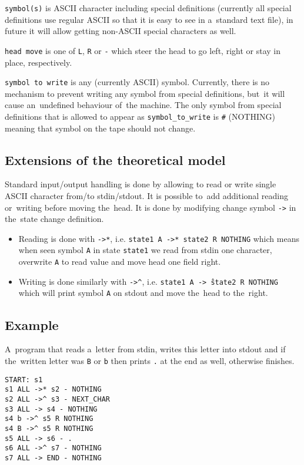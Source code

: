 \documentclass[english,shortabstract,mgr]{iithesis}
\begin{document}
\texttt{symbol(s)} is ASCII character including special definitions (currently
all special definitions use regular ASCII so that it is easy to see
in a~standard text file), in future it will allow getting non-ASCII special
characters as well.

\texttt{head move} is one of \texttt{L}, \texttt{R} or \texttt{-} which
steer the head to go left, right or stay in place, respectively.

\texttt{symbol to write} is any (currently ASCII) symbol. Currently, there
is no mechanism to prevent writing any symbol from special definitions,
but~it will cause an~undefined behaviour of~the machine. The only symbol
from special definitions that is allowed to appear as \texttt{symbol\_to\_write}
is \texttt{\#} (NOTHING) meaning that symbol on the tape should not change.

\subsection {Extensions of the theoretical model}

Standard input/output handling is done by allowing to read or write single
ASCII character from/to stdin/stdout. It is possible to~add additional
reading or~writing before moving the~head. It is done by modifying change
symbol \texttt{->} in the~state change definition.
\begin{itemize}
  \item Reading is done with \texttt{->*}, i.e. \texttt{state1 A ->* state2 R NOTHING}
        which means when seen symbol \texttt{A} in state \texttt{state1} we read
        from stdin one character, overwrite \texttt{A} to read value and move
        head one field right.
  \item Writing is done similarly with \texttt{->\^},
        i.e. \texttt{state1 A ->\^\ state2 R NOTHING} which will print symbol
        \texttt{A} on stdout and move the~head to the~right.
\end{itemize}

\subsection{Example}

A~program that reads a~letter from stdin, writes this letter into
stdout and if the~written letter was \texttt{B} or \texttt{b} then prints
\texttt{.} at the end as well, otherwise finishes.

\begin{verbatim}
START: s1
s1 ALL ->* s2 - NOTHING
s2 ALL ->^ s3 - NEXT_CHAR
s3 ALL -> s4 - NOTHING
s4 b ->^ s5 R NOTHING
s4 B ->^ s5 R NOTHING
s5 ALL -> s6 - .
s6 ALL ->^ s7 - NOTHING
s7 ALL -> END - NOTHING
\end{verbatim}
\end{document}
